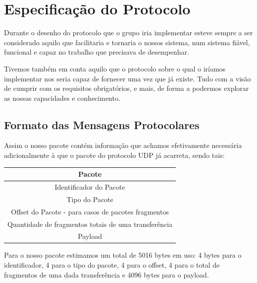 \documentclass[11pt]{article}
\begin{document}
\newpage
\section{Especificação do Protocolo}

\par Durante o desenho do protocolo que o grupo iria implementar esteve sempre a ser considerado aquilo que facilitaria e tornaria o nossos sistema, num sistema fiável, funcional e capaz no trabalho que precisava de desempenhar.

\par Tivemos também em conta aquilo que o protocolo sobre o qual o iríamos implementar nos seria capaz de fornecer uma vez que já existe.  Tudo com a visão de cumprir com os requisitos obrigatórios, e mais, de forma a podermos explorar as nossas capacidades e conhecimento.

\subsection{Formato das Mensagens Protocolares}

\par Assim o nosso pacote contém informação que achamos efetivamente necessária adicionalmente à que o pacote do protocolo UDP já acarreta, sendo tais:

\begin{table}[!h]
\centering
\begin{tabular}{|c|}
\hline
\textbf{Pacote}                                                            \\ \hline
Identificador do Pacote                                                    \\ \hline
Tipo do Pacote                                                             \\ \hline
Offset do Pacote - para casos de pacotes fragmentos                        \\ \hline
\multicolumn{1}{|l|}{Quantidade de fragmentos totais de uma transferência} \\ \hline
Payload                                                                    \\ \hline
\end{tabular}
\end{table}

\par Para o nosso pacote estimamos um total de 5016 bytes em uso: 4 bytes para o identificador, 4 para o tipo do pacote, 4 para o offset, 4 para o total de fragmentos de uma dada transferência e 4096 bytes para o payload.\\
\end{document}
